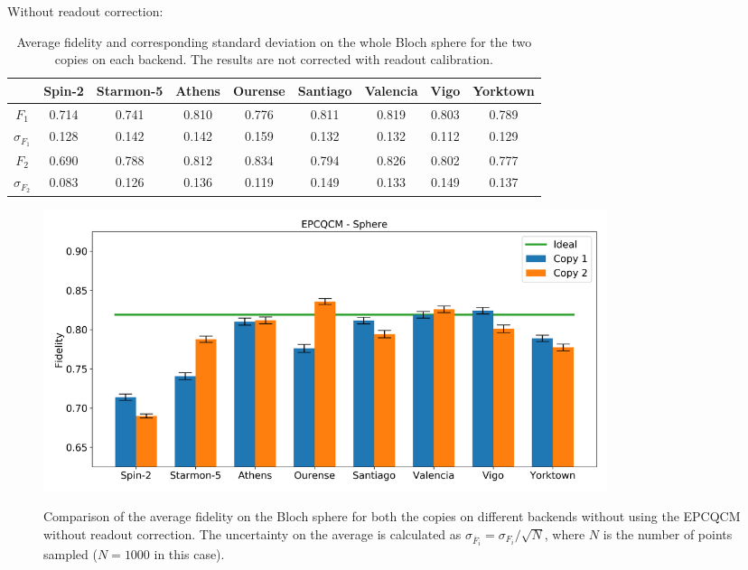 Without readout correction:
\begin{table}[H]
    \centering
    \begin{tabular}{|c|c|c|c|c|c|c|c|c|}
    \hline
    \textbf{} & \textbf{Spin-2} & \textbf{Starmon-5} & \textbf{Athens} & \textbf{Ourense} & \textbf{Santiago} & \textbf{Valencia} & \textbf{Vigo} & \textbf{Yorktown} \\ \hline
    $F_1$              & 0.714  & 0.741 & 0.810 & 0.776 & 0.811 & 0.819 & 0.803 & 0.789 \\ \hline
    $\sigma_{F_1}$     & 0.128  & 0.142 & 0.142 & 0.159 & 0.132 & 0.132 & 0.112 & 0.129 \\ \hline
    $F_2$              & 0.690  & 0.788 & 0.812 & 0.834 & 0.794 & 0.826 & 0.802 & 0.777 \\ \hline
    $\sigma_{F_2}$     & 0.083  & 0.126 & 0.136 & 0.119 & 0.149 & 0.133 & 0.149 & 0.137 \\ \hline
    \end{tabular}
    \caption{Average fidelity and corresponding standard deviation on the whole Bloch sphere for the two copies on each backend. The results are not corrected with readout calibration.}
    \label{tab:results_epcqcm_fullsphere_not_corrected}
\end{table}
\begin{figure}[H]
  \centering
          \includegraphics[width=0.8\textwidth]{Figures/Economical/Histograms/histo_sphere.png}
      \label{fig:epc_histo_sphere_not_corrected}
      \caption{Comparison of the average fidelity on the Bloch sphere for both the copies on different backends without using the EPCQCM without readout correction. The uncertainty on the average is calculated as $\sigma_{\overline{F}_i}=\sigma_{F_i}/\sqrt{N}$, where $N$ is the number of points sampled ($N=1000$ in this case).}
\end{figure}

